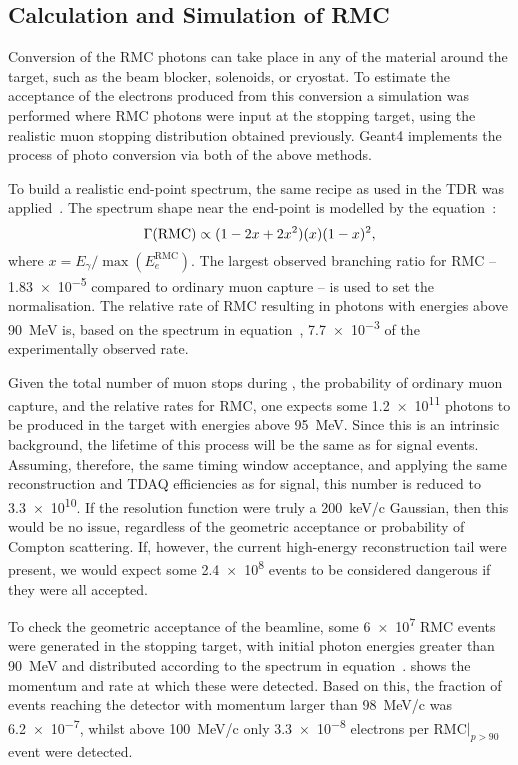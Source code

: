 \subsection{Calculation and Simulation of RMC}
Conversion of the RMC photons can take place in any of the material around the target, such as the beam blocker, solenoids, or cryostat.
To estimate the acceptance of the electrons produced from this conversion a simulation was performed where RMC photons were input at the stopping target, using the realistic muon stopping distribution obtained previously.
Geant4 implements the process of photo conversion via both of the above methods.

To build a realistic end-point spectrum, the same recipe as used in the \phaseI TDR was applied~\cite{TDR2016}.
The spectrum shape near the end-point is modelled by the equation~\cite{CHRISTILLIN1980331}:
\begin{equation}
	\eqlabel{bg:rmc:spect}
	\Gamma(\textrm{RMC})\propto(1-2x+2x^2)(x)(1-x)^2,
\end{equation}
where $x=E_\gamma/\max(E_e^\textrm{RMC})$.
The largest observed branching ratio for \ac{RMC} -- \num{1.83e-5} compared to ordinary muon capture --  is used to set the normalisation.
The relative rate of \ac{RMC} resulting in photons with energies above 90~MeV is, based on the spectrum in equation~, \num{7.7e-3} of the experimentally observed rate.
\FigRMCSimResults

Given the total number of muon stops during \phaseII, the probability of ordinary muon capture, and the relative rates for \ac{RMC}, one expects some \num{1.2e11} photons to be produced in the target with energies above 95~MeV.
Since this is an intrinsic background, the lifetime of this process will be the same as for signal events. 
Assuming, therefore, the same timing window acceptance, and applying the same reconstruction and TDAQ efficiencies as for signal, this number is reduced to \num{3.3e10}.
If the resolution function were truly a 200~keV/c Gaussian, then this would be no issue, regardless of the geometric acceptance or probability of Compton scattering.
If, however, the current \phaseI high-energy reconstruction tail were present, we would expect some \num{2.4e8} events to be considered dangerous if they were all accepted.

To check the geometric acceptance of the beamline, some \num{6e7} RMC events were generated in the stopping target, with initial photon energies greater than 90~MeV and distributed according to the spectrum in equation~.
 shows the momentum and rate at which these were detected.
Based on this, the fraction of events reaching the detector with momentum larger than 98~MeV/c was \num{6.2e-7}, whilst above 100~MeV/c only \num{3.3e-8} electrons per \ac{RMC}$|_{p>90}$ event were detected.

